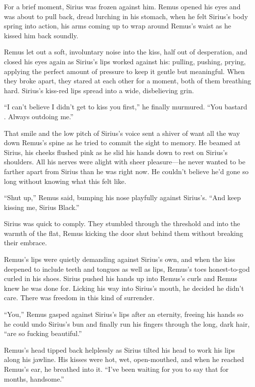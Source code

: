 For a brief moment, Sirius was frozen against him. Remus opened his eyes and was about to pull back, dread lurching in his stomach, when he felt Sirius’s body spring into action, his arms coming up to wrap around Remus’s waist as he kissed him back soundly.

Remus let out a soft, involuntary noise into the kiss, half out of desperation, and closed his eyes again as Sirius’s lips worked against his: pulling, pushing, prying, applying the perfect amount of pressure to keep it gentle but meaningful. When they broke apart, they stared at each other for a moment, both of them breathing hard. Sirius’s kiss-red lips spread into a wide, disbelieving grin.

“I can’t believe I didn’t get to kiss you first,” he finally murmured. “You bastard . Always outdoing me.”

That smile and the low pitch of Sirius’s voice sent a shiver of want all the way down Remus’s spine as he tried to commit the sight to memory. He beamed at Sirius, his cheeks flushed pink as he slid his hands down to rest on Sirius’s shoulders. All his nerves were alight with sheer pleasure—he never wanted to be farther apart from Sirius than he was right now. He couldn’t believe he’d gone so long without knowing what this felt like.

“Shut up,” Remus said, bumping his nose playfully against Sirius’s. “And keep kissing me, Sirius Black.”

Sirius was quick to comply. They stumbled through the threshold and into the warmth of the flat, Remus kicking the door shut behind them without breaking their embrace.

Remus’s lips were quietly demanding against Sirius’s own, and when the kiss deepened to include teeth and tongues as well as lips, Remus’s toes honest-to-god curled in his shoes. Sirius pushed his hands up into Remus’s curls and Remus knew he was done for. Licking his way into Sirius’s mouth, he decided he didn’t care. There was freedom in this kind of surrender.

“You,” Remus gasped against Sirius’s lips after an eternity, freeing his hands so he could undo Sirius’s bun and finally run his fingers through the long, dark hair, “are so fucking beautiful.”

Remus’s head tipped back helplessly as Sirius tilted his head to work his lips along his jawline. His kisses were hot, wet, open-mouthed, and when he reached Remus’s ear, he breathed into it. “I’ve been waiting for you to say that for months, handsome.”

